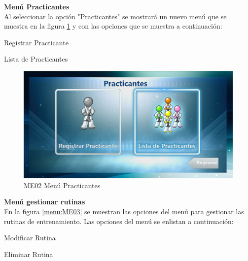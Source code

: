 \textbf{\textcolor[rgb]{0, 0, 0.545098}{Menú Practicantes}}\\

Al seleccionar la opción "Practicantes" se mostrará un nuevo menú que se muestra en la figura \ref{menu:ME02} y con las opciones que se muestra a continuación:\\

\begin{compactitem} 
	\setlength\itemsep{-0.25em}
	\item Registrar Practicante
	\item Lista de Practicantes
\end{compactitem} 

\begin{figure}[H]
	\centering
		\includegraphics[scale=0.5]{./Figuras/Menus/ME02Practicantes}
	\caption{ME02 Menú Practicantes}
	\label{menu:ME02}
\end{figure}

\textbf{\textcolor[rgb]{0, 0, 0.545098}{Menú gestionar rutinas}}\\

En la figura \ref{menu:ME03} se muestran las opciones del menú para gestionar las rutinas de entrenamiento. Las opciones del menú se enlistan a continuación:\\

\begin{compactitem} 
	\setlength\itemsep{-0.25em}
	\item Modificar Rutina
	\item Eliminar Rutina
\end{compactitem} 

